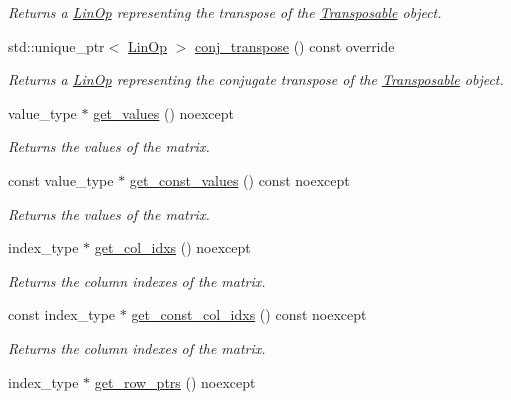 \begin{DoxyCompactItemize}
\begin{DoxyCompactList}\small\item\em Returns a \hyperlink{classgko_1_1LinOp}{Lin\+Op} representing the transpose of the \hyperlink{classgko_1_1Transposable}{Transposable} object. \end{DoxyCompactList}\item 
std\+::unique\+\_\+ptr$<$ \hyperlink{classgko_1_1LinOp}{Lin\+Op} $>$ \hyperlink{classgko_1_1matrix_1_1Csr_a38820451af5424f18b767667f3067d72}{conj\+\_\+transpose} () const override
\begin{DoxyCompactList}\small\item\em Returns a \hyperlink{classgko_1_1LinOp}{Lin\+Op} representing the conjugate transpose of the \hyperlink{classgko_1_1Transposable}{Transposable} object. \end{DoxyCompactList}\item 
value\+\_\+type $\ast$ \hyperlink{classgko_1_1matrix_1_1Csr_a929b0a194e6aeb1252b8e6781d162e83}{get\+\_\+values} () noexcept
\begin{DoxyCompactList}\small\item\em Returns the values of the matrix. \end{DoxyCompactList}\item 
const value\+\_\+type $\ast$ \hyperlink{classgko_1_1matrix_1_1Csr_a1801347665214bbefc837b44ba0695ff}{get\+\_\+const\+\_\+values} () const noexcept
\begin{DoxyCompactList}\small\item\em Returns the values of the matrix. \end{DoxyCompactList}\item 
index\+\_\+type $\ast$ \hyperlink{classgko_1_1matrix_1_1Csr_a81c6294177a1be4873804c8a85a9fc64}{get\+\_\+col\+\_\+idxs} () noexcept
\begin{DoxyCompactList}\small\item\em Returns the column indexes of the matrix. \end{DoxyCompactList}\item 
const index\+\_\+type $\ast$ \hyperlink{classgko_1_1matrix_1_1Csr_ac9d640d26449e0ee46c7cb2b80100d65}{get\+\_\+const\+\_\+col\+\_\+idxs} () const noexcept
\begin{DoxyCompactList}\small\item\em Returns the column indexes of the matrix. \end{DoxyCompactList}\item 
index\+\_\+type $\ast$ \hyperlink{classgko_1_1matrix_1_1Csr_a068e5158cf282fa977f0a137f8cd7f03}{get\+\_\+row\+\_\+ptrs} () noexcept

\end{DoxyCompactItemize}
